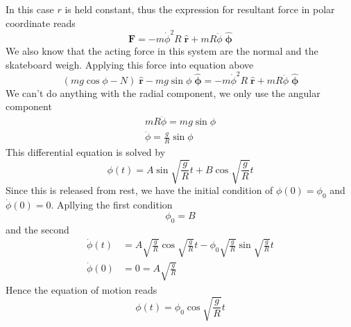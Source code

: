 \documentclass[../../../main.tex]{subfiles}
\begin{document}
In this case $r$ is held constant, thus the expression for resultant force in polar coordinate reads
\begin{equation*}
    \mathbf{F}=-m\dot{\phi}^2R\;\mathbf{\hat{r}}+ mR\ddot{\phi} \;\boldsymbol{ \hat{\phi}}
\end{equation*}
We also know that the acting force in this system are the normal and the skateboard weigh. Applying this force into equation above
\begin{equation*}
    \left(mg\cos\phi-N\right) \;\mathbf{\hat{r}}-mg\sin\phi\; \boldsymbol{ \hat{\phi}}=-m\dot{\phi}^2R\;\mathbf{\hat{r}}+ mR\ddot{\phi} \;\boldsymbol{ \hat{\phi}}
\end{equation*}
We can't do anything with the radial component, we only use the angular component
\begin{align*}
    mR\ddot{\phi} = mg\sin\phi \\
    \ddot{\phi} = {\frac{g}{R}} \sin\phi
\end{align*}
This differential equation is solved by 
\begin{equation*}
    \phi(t)=A\sin \sqrt{\frac{g}{R}}t +B\cos \sqrt{\frac{g}{R}}t
\end{equation*}
Since this is released from rest, we have the initial condition of $\phi(0)=\phi_0$ and $\dot{\phi}(0)=0$. Apllying the first condition
\begin{equation*}
    \phi_0=B
\end{equation*}
and the second
\begin{align*}
    \dot{\phi}(t)&=A\sqrt{\frac{g}{R}} \cos \sqrt{\frac{g}{R}}t -\phi_0\sqrt{\frac{g}{R}}\sin \sqrt{\frac{g}{R}}t\\
    \dot{\phi}(0)&=0=A\sqrt{\frac{g}{R}}
\end{align*}
Hence the equation of motion reads
\begin{equation*}
    \phi(t)=\phi_0\cos \sqrt{\frac{g}{R}}t
\end{equation*}
\end{document}
